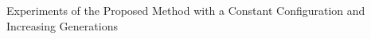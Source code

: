 \label{constant-configuration-generations}Experiments of the Proposed Method with a Constant Configuration and Increasing Generations
  